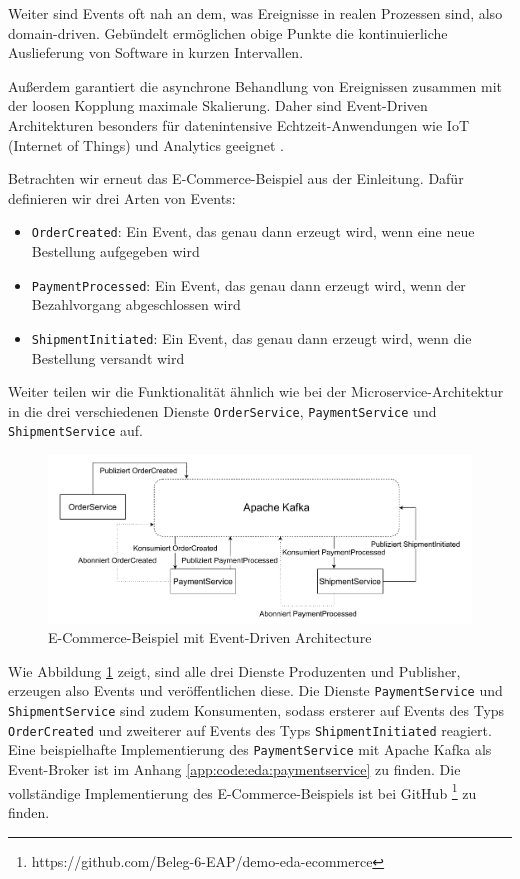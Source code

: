 \documentclass[acmtog]{acmart}
\begin{document}
Weiter sind Events oft nah an dem, was Ereignisse in realen Prozessen sind, also domain-driven.
Gebündelt ermöglichen obige Punkte die kontinuierliche Auslieferung von Software in kurzen Intervallen.

Außerdem garantiert die asynchrone Behandlung von Ereignissen zusammen mit der loosen Kopplung maximale Skalierung.
Daher sind Event-Driven Architekturen besonders für datenintensive Echtzeit-Anwendungen wie IoT (Internet of Things) und Analytics geeignet \cite{iotEda}.

Betrachten wir erneut das E-Commerce-Beispiel aus der Einleitung.
Dafür definieren wir drei Arten von Events:
\begin{itemize}
  \item \texttt{OrderCreated}: Ein Event, das genau dann erzeugt wird, wenn eine neue Bestellung aufgegeben wird
  \item \texttt{PaymentProcessed}: Ein Event, das genau dann erzeugt wird, wenn der Bezahlvorgang abgeschlossen wird
  \item \texttt{ShipmentInitiated}: Ein Event, das genau dann erzeugt wird, wenn die Bestellung versandt wird
\end{itemize}

Weiter teilen wir die Funktionalität ähnlich wie bei der Microservice-Architektur in die drei verschiedenen Dienste \texttt{OrderService}, \texttt{PaymentService} und \texttt{ShipmentService} auf.

\begin{figure}[!h]
  \centering
  \includegraphics[width=\linewidth]{images/eda/eda-ecommerce.drawio}
  \caption{E-Commerce-Beispiel mit Event-Driven Architecture}
  \label{fig:edaecommerce}
\end{figure}
Wie Abbildung \ref{fig:edaecommerce} zeigt, sind alle drei Dienste Produzenten und Publisher, erzeugen also Events und veröffentlichen diese.
Die Dienste \texttt{PaymentService} und \texttt{ShipmentService} sind zudem Konsumenten,
sodass ersterer auf Events des Typs \texttt{OrderCreated} und zweiterer auf Events des Typs \texttt{ShipmentInitiated} reagiert.
Eine beispielhafte Implementierung des \texttt{PaymentService} mit Apache Kafka als Event-Broker ist im Anhang \ref{app:code:eda:paymentservice} zu finden.
Die vollständige Implementierung des E-Commerce-Beispiels ist bei GitHub \footnote{https://github.com/Beleg-6-EAP/demo-eda-ecommerce} zu finden.
\end{document}
